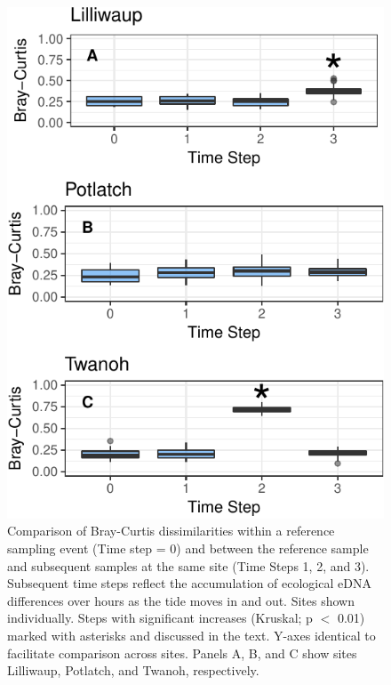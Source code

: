 \documentclass[fleqn,10pt,lineno]{wlpeerj} %
\begin{document}
\begin{figure}[!ht]

{\centering \includegraphics{figures/FIG3_BrayCurtis_timeSeries-1} 

}

\caption{\label{fig:TimeSeriesFigure}Comparison of Bray-Curtis dissimilarities within a reference sampling event (Time step = 0) and between the reference sample and subsequent samples at the same site (Time Steps 1, 2, and 3). Subsequent time steps reflect the accumulation of ecological eDNA differences over hours as the tide moves in and out. Sites shown individually. Steps with significant increases (Kruskal; p $<$ 0.01) marked with asterisks and discussed in the text. Y-axes identical to facilitate comparison across sites. Panels A, B, and C show sites Lilliwaup, Potlatch, and Twanoh, respectively.}\label{fig:FIG3_BrayCurtis_timeSeries}
\end{figure}
\end{document}
